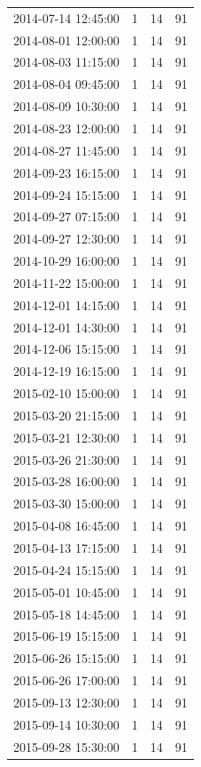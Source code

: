 \begin{tabular}{lrrr}
2014-07-14 12:45:00 & 1 & 14 & 91 \\
2014-08-01 12:00:00 & 1 & 14 & 91 \\
2014-08-03 11:15:00 & 1 & 14 & 91 \\
2014-08-04 09:45:00 & 1 & 14 & 91 \\
2014-08-09 10:30:00 & 1 & 14 & 91 \\
2014-08-23 12:00:00 & 1 & 14 & 91 \\
2014-08-27 11:45:00 & 1 & 14 & 91 \\
2014-09-23 16:15:00 & 1 & 14 & 91 \\
2014-09-24 15:15:00 & 1 & 14 & 91 \\
2014-09-27 07:15:00 & 1 & 14 & 91 \\
2014-09-27 12:30:00 & 1 & 14 & 91 \\
2014-10-29 16:00:00 & 1 & 14 & 91 \\
2014-11-22 15:00:00 & 1 & 14 & 91 \\
2014-12-01 14:15:00 & 1 & 14 & 91 \\
2014-12-01 14:30:00 & 1 & 14 & 91 \\
2014-12-06 15:15:00 & 1 & 14 & 91 \\
2014-12-19 16:15:00 & 1 & 14 & 91 \\
2015-02-10 15:00:00 & 1 & 14 & 91 \\
2015-03-20 21:15:00 & 1 & 14 & 91 \\
2015-03-21 12:30:00 & 1 & 14 & 91 \\
2015-03-26 21:30:00 & 1 & 14 & 91 \\
2015-03-28 16:00:00 & 1 & 14 & 91 \\
2015-03-30 15:00:00 & 1 & 14 & 91 \\
2015-04-08 16:45:00 & 1 & 14 & 91 \\
2015-04-13 17:15:00 & 1 & 14 & 91 \\
2015-04-24 15:15:00 & 1 & 14 & 91 \\
2015-05-01 10:45:00 & 1 & 14 & 91 \\
2015-05-18 14:45:00 & 1 & 14 & 91 \\
2015-06-19 15:15:00 & 1 & 14 & 91 \\
2015-06-26 15:15:00 & 1 & 14 & 91 \\
2015-06-26 17:00:00 & 1 & 14 & 91 \\
2015-09-13 12:30:00 & 1 & 14 & 91 \\
2015-09-14 10:30:00 & 1 & 14 & 91 \\
2015-09-28 15:30:00 & 1 & 14 & 91 \\

\end{tabular}
